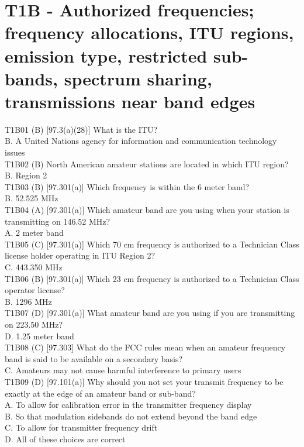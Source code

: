 \documentclass[12pt,letterpaper]{report}
\begin{document}
\section{T1B - Authorized frequencies; frequency allocations, ITU regions, emission type, restricted sub-bands, spectrum sharing, transmissions near band edges}

T1B01 (B) [97.3(a)(28)] What is the ITU?\\
B. A United Nations agency for information and communication technology issues\\

T1B02 (B) North American amateur stations are located in which ITU region?\\
B. Region 2\\

T1B03 (B) [97.301(a)] Which frequency is within the 6 meter band?\\
B. 52.525 MHz\\

T1B04 (A) [97.301(a)] Which amateur band are you using when your station is transmitting on 146.52 MHz?\\
A. 2 meter band\\

T1B05 (C) [97.301(a)] Which 70 cm frequency is authorized to a Technician Class license holder operating in ITU Region 2?\\
C. 443.350 MHz\\

T1B06 (B) [97.301(a)] Which 23 cm frequency is authorized to a Technician Class operator license?\\
B. 1296 MHz\\

T1B07 (D) [97.301(a)] What amateur band are you using if you are transmitting on 223.50 MHz?\\
D. 1.25 meter band\\

T1B08 (C) [97.303] What do the FCC rules mean when an amateur frequency band is said to be available on a secondary basis?\\
C. Amateurs may not cause harmful interference to primary users\\

T1B09 (D) [97.101(a)] Why should you not set your transmit frequency to be exactly at the edge of an amateur band or sub-band?\\
A. To allow for calibration error in the transmitter frequency display\\
B. So that modulation sidebands do not extend beyond the band edge\\
C. To allow for transmitter frequency drift\\
D. All of these choices are correct\\
\end{document}
